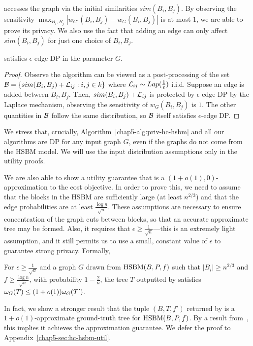 \dphcblocks{} accesses the graph via the initial similarities $sim(B_i, B_j)$. By observing the sensitivity $\max_{B_i, B_j} |w_{G'}(B_i, B_j) - w_G(B_i, B_j)|$ is at most $1$, we are able to prove its privacy. We also use the fact that adding an edge can only affect $sim(B_i, B_j)$ for just one choice of $B_i, B_j$.
\begin{thm}
\dphcblocks{} satisfies $\epsilon$-edge DP in the parameter $G$.
\end{thm}
\begin{proof}
Observe the algorithm can be viewed as a post-processing of the set $\mathcal{B} = \{sim(B_i, B_j) + \mathcal{L}_{ij} : i,j \in k\}$ where $\mathcal{L}_{ij} \sim Lap(\frac{1}{\varepsilon})$ i.i.d. Suppose an edge is added between $B_{i}, B_{j}$. Then, $sim(B_{i}, B_{j}) + \mathcal{L}_{ij}$ is protected by $\epsilon$-edge DP by the Laplace mechanism, observing the sensitivity of $w_G(B_{i}, B_{j})$ is $1$. The other quantities in $\mathcal{B}$ follow the same distribution, so $\mathcal{B}$ itself satisfies $\epsilon$-edge DP.
\end{proof}
We stress that, crucially,
Algorithm~\ref{chap5-alg:priv-hc-hsbm} and all our algorithms are DP for any input graph $G$, even if the graphs do not come from the HSBM model. We will use the input distribution assumptions only in the utility proofs.

We are also able to show a utility guarantee that \dphcblocks{} is a $(1+o(1), 0)$-approximation to the cost objective. In order to prove this, we need to assume that the blocks in the HSBM are sufficiently large (at least $n^{2/3}$) and that the edge probabilities are at least $\frac{\log n}{\sqrt{n}}$. These assumptions are necessary to ensure concentration of the graph cuts between blocks, so that an accurate approximate tree may be formed. Also, it requires that $\epsilon \geq \frac{1}{\sqrt{n}}$---this is an extremely light assumption, and it still permits us to use a small, constant value of $\epsilon$ to guarantee strong privacy. Formally,

\begin{thm}\label{chap5-thm:hc-hsbm-util}
For $\epsilon \geq \frac{1}{\sqrt{n}}$ and a graph $G$ drawn from $\textnormal{HSBM}(B, P, f)$ such that $|B_i| \geq n^{2/3}$ and $f \geq \frac{\log n}{\sqrt{n}}$, with probability $1-\frac{2}{n}$, the tree $T$ outputted by \dphcblocks{} satisfies
$\omega_G(T) \leq (1 + o(1)) \omega_G(T')$.
\end{thm}
In fact, we show a stronger result that the tuple $(B,T,f')$ returned by \dphcblocks{} is a $1+o(1)$-approximate ground-truth tree for $\textnormal{HSBM}(B,P,f)$. By a result from~\citet{cohen2019hierarchical}, this implies it achieves the approximation guarantee. We defer the proof to Appendix~\ref{chap5-sec:hc-hsbm-util}.

